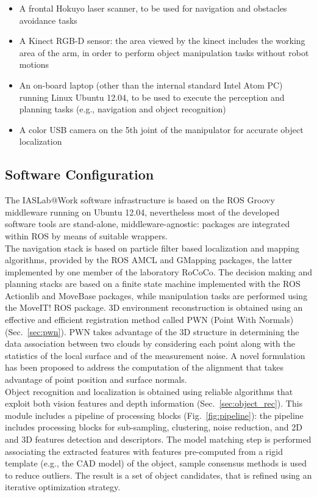 \documentclass[conference]{IEEEtran}
\begin{document}
\begin{itemize}
 \item A frontal Hokuyo laser scanner, to be used for navigation and obstacles avoidance tasks
 \item A Kinect RGB-D sensor: the area viewed by the kinect includes the working area of the arm, in order to perform object manipulation tasks without robot motions
 \item An on-board laptop (other than the internal standard Intel Atom PC) running Linux Ubuntu 12.04, to be used to execute the perception and planning tasks (e.g., navigation and object recognition)
 \item A color USB camera on the 5th joint of the manipulator for accurate object localization
\end{itemize}
 
\subsection{Software Configuration}

The IASLab@Work software infrastructure is based on the ROS Groovy middleware running on Ubuntu 12.04, nevertheless most of the developed software tools are stand-alone, middleware-agnostic: packages are integrated within ROS by means of suitable wrappers.\\
The navigation stack is based on particle filter based localization and mapping algorithms, provided by the ROS AMCL and GMapping packages, the latter implemented by one member of the laboratory RoCoCo. The decision making and planning stacks are based on a finite state machine implemented with the ROS Actionlib and MoveBase packages, while manipulation tasks are performed using the MoveIT! ROS package.
3D environment reconstruction is obtained using an effective and efficient registration method called PWN (Point With Normals) (Sec.~\ref{sec:pwn}). 
PWN takes advantage of the 3D structure in determining the data association between two clouds by considering each point along with the statistics of the local surface and of the measurement noise. A novel formulation has been proposed to address the computation of the alignment that takes advantage of point position and surface normals.\\

Object recognition and localization is obtained using reliable algorithms that exploit both vision features and depth information (Sec.~\ref{sec:object_rec}). This module includes a pipeline of processing blocks (Fig.~\ref{fig:pipeline}): the pipeline includes processing blocks for sub-sampling, clustering, noise reduction, and 2D and 3D features detection and descriptors. The model matching step is performed associating the extracted features with features pre-computed from a rigid template (e.g., the CAD model) of the object, sample consensus methods is used to reduce outliers. The result is a set of object candidates, that is refined using an iterative optimization strategy. 
\end{document}

